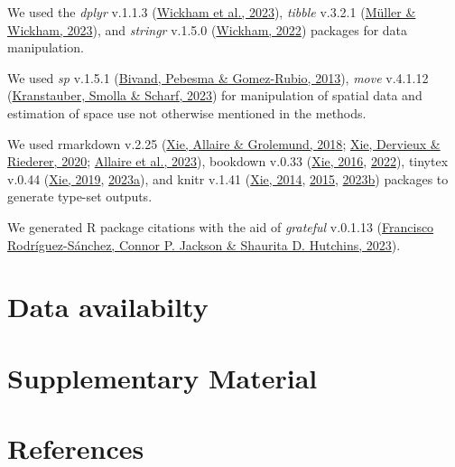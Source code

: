 \documentclass[10pt,a4paper]{article}
\begin{document}
We used the \emph{dplyr} v.1.1.3 (\protect\hyperlink{ref-dplyr}{Wickham et al., 2023}), \emph{tibble} v.3.2.1 (\protect\hyperlink{ref-tibble}{Müller \& Wickham, 2023}),
and \emph{stringr} v.1.5.0 (\protect\hyperlink{ref-stringr}{Wickham, 2022}) packages for data manipulation.

We used \emph{sp} v.1.5.1 (\protect\hyperlink{ref-sp}{Bivand, Pebesma \& Gomez-Rubio, 2013}), \emph{move} v.4.1.12 (\protect\hyperlink{ref-move}{Kranstauber, Smolla \& Scharf, 2023}) for manipulation of spatial data and estimation of space use not otherwise mentioned in the methods.

We used rmarkdown v.2.25 (\protect\hyperlink{ref-rmarkdown2018}{Xie, Allaire \& Grolemund, 2018}; \protect\hyperlink{ref-rmarkdown2020}{Xie, Dervieux \& Riederer, 2020}; \protect\hyperlink{ref-rmarkdown2023}{Allaire et al., 2023}), bookdown v.0.33 (\protect\hyperlink{ref-bookdown2016}{Xie, 2016}, \protect\hyperlink{ref-R-bookdown}{2022}), tinytex v.0.44 (\protect\hyperlink{ref-tinytex2019}{Xie, 2019}, \protect\hyperlink{ref-tinytex2023}{2023a}), and knitr v.1.41 (\protect\hyperlink{ref-knitr2014}{Xie, 2014}, \protect\hyperlink{ref-knitr2015}{2015}, \protect\hyperlink{ref-knitr2023}{2023b}) packages to generate type-set outputs.

We generated R package citations with the aid of \emph{grateful} v.0.1.13 (\protect\hyperlink{ref-grateful}{Francisco Rodríguez-Sánchez, Connor P. Jackson \& Shaurita D. Hutchins, 2023}).

\hypertarget{data-availabilty}{%
\section{Data availabilty}\label{data-availabilty}}

\hypertarget{supplementary-material}{%
\section{Supplementary Material}\label{supplementary-material}}

\hypertarget{references}{%
\section*{References}\label{references}}
\end{document}
